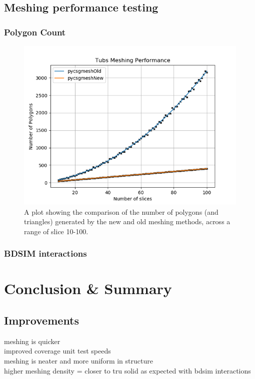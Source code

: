 \documentclass[12pt,a4paper]{article}
\begin{document}
\subsection{Meshing performance testing}
\subsubsection{Polygon Count}

\begin{figure}[h!]
\centering
\includegraphics[scale=0.6]{Images//Quad_fits//Tubs_quad.png}
\caption[width=\columnwidth]{A plot showing the comparison of the number of polygons (and triangles) generated by the new and old meshing methods, across a range of slice 10-100.}
\label{conts}
\end{figure}
\subsubsection{BDSIM interactions}

\newpage
\section{Conclusion \& Summary}
\label{conc}
\subsection{Improvements}
meshing is quicker\\
improved coverage unit test speeds\\
meshing is neater and more uniform in structure\\
higher meshing density = closer to tru solid as expected with bdsim interactions\\
\end{document}
